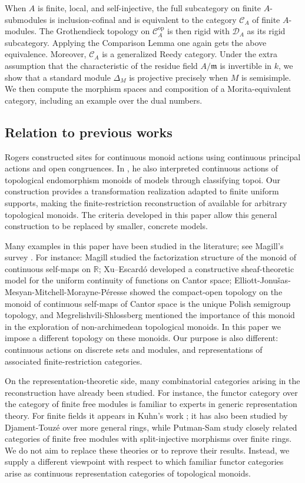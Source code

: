 \documentclass[10pt, reqno]{amsart}
\theoremstyle{plain}
\numberwithin{equation}{section}
\theoremstyle{definition}
\newcommand{\op}{\mathrm{op}}
\newcommand{\C}{\mathscr C}
\newcommand{\D}{\mathscr D}
\begin{document}
When $A$ is finite, local, and self-injective, the full subcategory on finite $A$-submodules is inclusion-cofinal and is equivalent to the category $\C_A$ of finite $A$-modules. The Grothendieck topology on $\C_A^{\op}$ is then rigid with $\D_A$ as its rigid subcategory. Applying the Comparison Lemma one again gets the above equivalence. Moreover, $\C_A$ is a generalized Reedy category. Under the extra assumption that the characteristic of the residue field $A/\mathfrak m$ is invertible in $k$, we show that a standard module $\Delta_M$ is projective precisely when $M$ is semisimple. We then compute the morphism spaces and composition of a Morita-equivalent category, including an example over the dual numbers.

\subsection{Relation to previous works}

Rogers \cite{Rogers} constructed sites for continuous monoid actions using continuous principal actions and open congruences. In \cite{Rogers1}, he also interpreted continuous actions of topological endomorphism monoids of models through classifying topoi. Our construction provides a transformation realization adapted to finite uniform supports, making the finite-restriction reconstruction of \cite{LiRel} available for arbitrary topological
monoids. The criteria developed in this paper allow this general construction to be replaced by smaller, concrete models.

Many examples in this paper have been studied in the literature; see Magill's survey \cite{Magill1}. For instance: Magill \cite{Magill2} studied the factorization structure of the monoid of continuous self-maps on $\mathbb{R}$; Xu--Escard\'o \cite{XE} developed a constructive sheaf-theoretic model for the uniform continuity of functions on Cantor space; Elliott-Jonu\v{s}as-Mesyan-Mitchell-Morayne-P\'eresse \cite{EJMMMP} showed the compact-open topology on the monoid of continuous self-maps of Cantor space is the unique Polish semigroup topology, and Megrelishvili-Shlossberg \cite{MS} mentioned the importance of this monoid in the exploration of non-archimedean topological monoids. In this paper we impose a different topology on these monoids. Our purpose is also different: continuous actions on discrete sets and modules, and representations of associated finite-restriction categories.

On the representation-theoretic side, many combinatorial categories arising in the reconstruction have already been studied. For instance, the functor category over the category of finite free modules is familiar to experts in generic representation theory. For finite fields it appears in Kuhn's work \cite{Kuhn}; it has also been studied by Djament-Touz\'e \cite{DjamentTouze} over more general rings, while Putman-Sam \cite{PS} study closely related categories of finite free modules with split-injective morphisms over finite rings. We do not aim to replace these theories or to reprove their results. Instead, we supply a different viewpoint with respect to which familiar functor categories arise as continuous representation categories of topological monoids.
\end{document}
